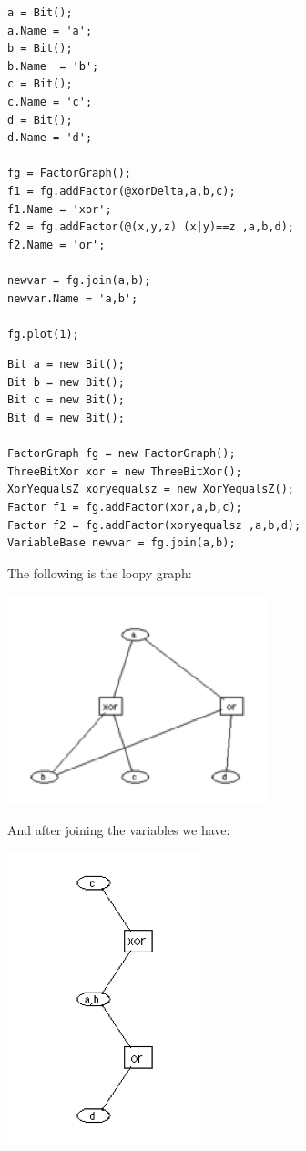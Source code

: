 \ifmatlab

\begin{lstlisting}
a = Bit(); 
a.Name = 'a'; 
b = Bit();
b.Name  = 'b';
c = Bit();
c.Name = 'c';
d = Bit();
d.Name = 'd';

fg = FactorGraph();
f1 = fg.addFactor(@xorDelta,a,b,c);
f1.Name = 'xor';
f2 = fg.addFactor(@(x,y,z) (x|y)==z ,a,b,d);
f2.Name = 'or';
 
newvar = fg.join(a,b);
newvar.Name = 'a,b';

fg.plot(1);
\end{lstlisting}

\fi

\ifjava
\begin{lstlisting}
Bit a = new Bit(); 
Bit b = new Bit();
Bit c = new Bit();
Bit d = new Bit();

FactorGraph fg = new FactorGraph();
ThreeBitXor xor = new ThreeBitXor();
XorYequalsZ xoryequalsz = new XorYequalsZ();
Factor f1 = fg.addFactor(xor,a,b,c);
Factor f2 = fg.addFactor(xoryequalsz ,a,b,d);
VariableBase newvar = fg.join(a,b);
\end{lstlisting}
\fi

The following is the loopy graph:

\includegraphics{images/LoopyGraph.png}
  
And after joining the variables we have:

\includegraphics{images/NonLoopyGraph.png}


